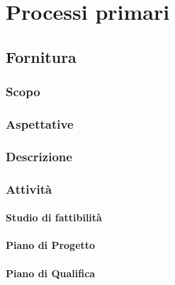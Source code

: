 \section{Processi primari}

\subsection{Fornitura}

	\subsubsection{Scopo}
	\subsubsection{Aspettative}
	\subsubsection{Descrizione}
	\subsubsection{Attività}
		\paragraph{Studio di fattibilità}
		\paragraph{Piano di Progetto}
		\paragraph{Piano di Qualifica}
